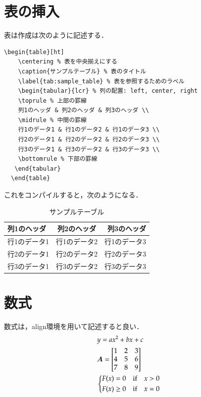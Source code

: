 \documentclass[../main/main]{subfiles}
\begin{document}
\section{表の挿入}
表は作成は次のように記述する．
\begin{lstlisting}[language={[latex]TeX}]
  \begin{table}[ht]
    \centering % 表を中央揃えにする
    \caption{サンプルテーブル} % 表のタイトル
    \label{tab:sample_table} % 表を参照するためのラベル
    \begin{tabular}{lcr} % 列の配置: left, center, right
    \toprule % 上部の罫線
    列1のヘッダ & 列2のヘッダ & 列3のヘッダ \\
    \midrule % 中間の罫線
    行1のデータ1 & 行1のデータ2 & 行1のデータ3 \\
    行2のデータ1 & 行2のデータ2 & 行2のデータ3 \\
    行3のデータ1 & 行3のデータ2 & 行3のデータ3 \\
    \bottomrule % 下部の罫線
   \end{tabular}
  \end{table}
\end{lstlisting}
これをコンパイルすると，次のようになる．
\begin{table}[ht]
  \centering %
  \caption{サンプルテーブル} %
  \label{tab:sample_table} %
  \begin{tabular}{lcr} %
  \toprule %
  列1のヘッダ & 列2のヘッダ & 列3のヘッダ \\
  \midrule %
  行1のデータ1 & 行1のデータ2 & 行1のデータ3 \\
  行2のデータ1 & 行2のデータ2 & 行2のデータ3 \\
  行3のデータ1 & 行3のデータ2 & 行3のデータ3 \\
  \bottomrule %
 \end{tabular}
\end{table}

\newpage
\section{数式}
数式は，align環境を用いて記述すると良い．
\begin{align}
  &y = a x^{2} + bx + c
  \\
  &\bm{A} = 
  \begin{bmatrix}
    1 & 2 & 3 \\
    4 & 5 & 6 \\
    7 & 8 & 9
  \end{bmatrix}
  \\
  &\begin{dcases}
    F(x) = 0 &\text{if}   \quad x>0
    \\
    F(x) \geq 0 &\text{if} \quad x=0
  \end{dcases}
\end{align}
\end{document}
